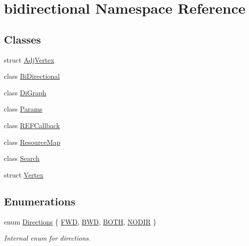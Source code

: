 \hypertarget{namespacebidirectional}{}\section{bidirectional Namespace Reference}
\label{namespacebidirectional}
\subsection*{Classes}
\begin{DoxyCompactItemize}
\item 
struct \hyperlink{structbidirectional_1_1AdjVertex}{Adj\+Vertex}
\item 
class \hyperlink{classbidirectional_1_1BiDirectional}{Bi\+Directional}
\item 
class \hyperlink{classbidirectional_1_1DiGraph}{Di\+Graph}
\item 
class \hyperlink{classbidirectional_1_1Params}{Params}
\item 
class \hyperlink{classbidirectional_1_1REFCallback}{R\+E\+F\+Callback}
\item 
class \hyperlink{classbidirectional_1_1ResourceMap}{Resource\+Map}
\item 
class \hyperlink{classbidirectional_1_1Search}{Search}
\item 
struct \hyperlink{structbidirectional_1_1Vertex}{Vertex}
\end{DoxyCompactItemize}
\subsection*{Enumerations}
\begin{DoxyCompactItemize}
\item 
enum \hyperlink{namespacebidirectional_a4cbe6f0bfbd3629c2cd44c98014aed70}{Directions} \{ \hyperlink{namespacebidirectional_a4cbe6f0bfbd3629c2cd44c98014aed70a798987f7644a83982bae650870e1ccc0}{F\+WD}, 
\hyperlink{namespacebidirectional_a4cbe6f0bfbd3629c2cd44c98014aed70a3e91263cd11d5fd4ceaec8830938740f}{B\+WD}, 
\hyperlink{namespacebidirectional_a4cbe6f0bfbd3629c2cd44c98014aed70ab50b3fbd895a667b43b3e9eb3bd54f85}{B\+O\+TH}, 
\hyperlink{namespacebidirectional_a4cbe6f0bfbd3629c2cd44c98014aed70a37837b18a2ed90dd3c428984af217f47}{N\+O\+D\+IR}
 \}\begin{DoxyCompactList}\small\item\em Internal enum for directions. \end{DoxyCompactList}
\end{DoxyCompactItemize}

